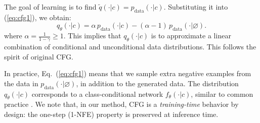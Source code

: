 The goal of learning is to find $\tilde{q}(\cdot|c)=p_\text{data}(\cdot|c)$.
Substituting it into (\ref{eq:cfg1}), we obtain:
\begin{equation}
q_\theta(\cdot|c) = \alpha\, p_{\text{data}}(\cdot|c) - (\alpha - 1)\, p_{\text{data}}(\cdot | \varnothing).
\label{eq:cfg2}
\end{equation}
where $\alpha=\frac{1}{1-\gamma} \geq 1$.
This implies that $q_\theta(\cdot|c)$ is to approximate a linear combination of conditional and unconditional data distributions. This follows the spirit of original CFG.



In practice, Eq.~(\ref{eq:cfg1}) means that we sample extra negative examples from the data in $p_{\text{data}}(\cdot | \varnothing)$, in addition to the generated data. The distribution $q_\theta(\cdot|c)$ corresponds to a class-conditional network $f_\theta(\cdot | c)$, similar to common practice \cite{ho2022classifier}.
We note that, in our method, CFG is a \textit{training-time} behavior by design: the one-step (1-NFE) property is preserved at inference time.



